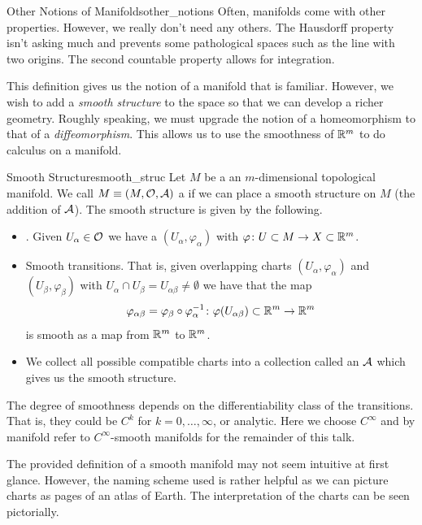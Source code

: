\begin{rmk}{Other Notions of Manifolds}{other_notions}
Often, manifolds come with other properties.  However, we really don't need any others.  The Hausdorff property isn't asking much and prevents some pathological spaces such as the line with two origins. The second countable property allows for integration.
\end{rmk}

This definition gives us the notion of a manifold that is familiar.  However, we wish to add a \emph{smooth structure} to the space so that we can develop a richer geometry. Roughly speaking, we must upgrade the notion of a homeomorphism to that of a \emph{diffeomorphism}. This allows us to use the smoothness of $\mathbb{R}^m$ to do calculus on a manifold.

\begin{df}{Smooth Structure}{smooth_struc}
Let $M$ be a an $m$-dimensional topological manifold.  We call $M\equiv(M,\mathcal{O},\mathcal{A})$ a  if we can place a smooth structure on $M$ (the addition of $\mathcal{A}$). The smooth structure is given by the following.
\begin{itemize}
    \item {}. Given $U_\alpha\in \mathcal{O}$ we have a $(U_\alpha,\varphi_\alpha)$ with $\varphi \colon U\subset M \to X \subset \mathbb{R}^m$.
    \item Smooth transitions. That is, given overlapping charts $(U_\alpha,\varphi_\alpha)$ and $(U_\beta,\varphi_\beta)$ with $U_\alpha \cap U_\beta = U_{\alpha \beta} \neq \emptyset$ we have that the map
    \[
    \varphi_{\alpha \beta} = \varphi_\beta \circ \varphi_\alpha^{-1} \colon \varphi(U_{\alpha \beta}) \subset \mathbb{R}^m \to \mathbb{R}^m
    \]
    is smooth as a map from $\mathbb{R}^m$ to $\mathbb{R}^m$.  
    \item We collect all possible compatible charts into a collection called an  $\mathcal{A}$ which gives us the smooth structure.
\end{itemize}
The degree of smoothness depends on the differentiability class of the transitions.  That is, they could be $C^k$ for $k=0,\dots,\infty$, or analytic. Here we choose $C^\infty$ and by manifold refer to $C^\infty$-smooth manifolds for the remainder of this talk.
\end{df}

The provided definition of a smooth manifold may not seem intuitive at first glance.  However, the naming scheme used is rather helpful as we can picture charts as pages of an atlas of Earth. The interpretation of the charts can be seen pictorially.

